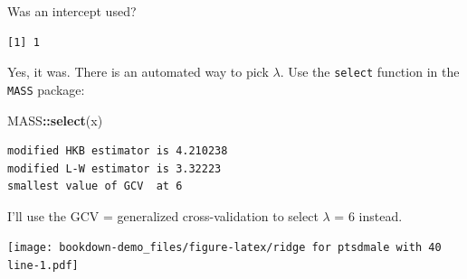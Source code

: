 \documentclass[]{book}
\newenvironment{Shaded}{\begin{snugshade}}{\end{snugshade}}
\newcommand{\KeywordTok}[1]{\textcolor[rgb]{0.13,0.29,0.53}{\textbf{#1}}}
\newcommand{\DataTypeTok}[1]{\textcolor[rgb]{0.13,0.29,0.53}{#1}}
\newcommand{\DecValTok}[1]{\textcolor[rgb]{0.00,0.00,0.81}{#1}}
\newcommand{\StringTok}[1]{\textcolor[rgb]{0.31,0.60,0.02}{#1}}
\newcommand{\OperatorTok}[1]{\textcolor[rgb]{0.81,0.36,0.00}{\textbf{#1}}}
\newcommand{\NormalTok}[1]{#1}
\theoremstyle{definition}
\theoremstyle{definition}
\theoremstyle{definition}
\theoremstyle{remark}
\begin{document}
Was an intercept used?

\begin{Shaded}
\end{Shaded}

\begin{verbatim}
[1] 1
\end{verbatim}

Yes, it was. There is an automated way to pick \(\lambda\). Use the
\texttt{select} function in the \texttt{MASS} package:

\begin{Shaded}
\begin{Highlighting}[]
\NormalTok{MASS}\OperatorTok{::}\KeywordTok{select}\NormalTok{(x)}
\end{Highlighting}
\end{Shaded}

\begin{verbatim}
modified HKB estimator is 4.210238 
modified L-W estimator is 3.32223 
smallest value of GCV  at 6 
\end{verbatim}

I'll use the GCV = generalized cross-validation to select \(\lambda\) =
6 instead.

\begin{Shaded}
\end{Shaded}

\texttt{[image: bookdown-demo\_files/figure-latex/ridge for ptsdmale with 40 line-1.pdf]}

\begin{Shaded}
\end{Shaded}
\end{document}
